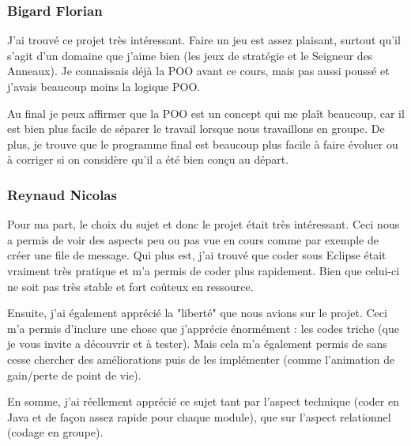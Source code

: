 \documentclass{article}
\begin{document}
  \subsubsection{Bigard Florian}
  J'ai trouvé ce projet très intéressant.
  Faire un jeu est assez plaisant, surtout qu'il s'agit d'un domaine que j'aime bien (les jeux de stratégie et le Seigneur des Anneaux).
  Je connaissais déjà la POO avant ce cours, mais pas aussi poussé et j'avais beaucoup moins la logique POO.

  Au final je peux affirmer que la POO est un concept qui me plaît beaucoup, car il est bien plus facile de séparer le travail lorsque nous travaillons en groupe.
  De plus, je trouve que le programme final est beaucoup plus facile à faire évoluer ou à corriger si on considère qu'il a été bien conçu au départ.

  \subsubsection{Reynaud Nicolas}
  Pour ma part, le choix du sujet et donc le projet était très intéressant.
  Ceci nous a permis de voir des aspects peu ou pas vue en cours comme par exemple de créer une file de message.
  Qui plus est, j'ai trouvé que coder sous Eclipse était vraiment très pratique et m'a permis de coder plus rapidement. 
  Bien que celui-ci ne soit pas très stable et fort coûteux en ressource.

  Ensuite, j'ai également apprécié la "liberté" que nous avions sur le projet. 
  Ceci m'a permis d'inclure une chose que j'apprécie énormément : les codes triche (que je vous invite a découvrir et à tester).
  Mais cela m'a également permis de sans cesse chercher des améliorations puis de les implémenter (comme l'animation de gain/perte de point de vie).

  En somme, j'ai réellement apprécié ce sujet tant par l'aspect technique (coder en Java et de façon assez rapide pour chaque module), que sur l'aspect relationnel (codage en groupe).

  
\end{document}
